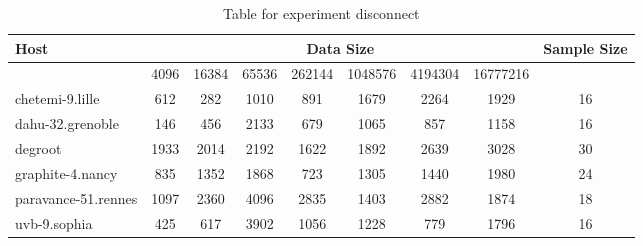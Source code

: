 \begin{table}
\caption{Table for experiment disconnect}
\begin{tabular}{@{}lcccccccc@{}}
\toprule
Host    & \multicolumn{7}{c}{Data Size}          & Sample Size \\ \midrule
& 4096  & 16384  & 65536  & 262144  & 1048576  & 4194304  & 16777216              \\ \midrule
chetemi-9.lille  & 612  & 282  & 1010  & 891  & 1679  & 2264  & 1929  & 16 \\
dahu-32.grenoble  & 146  & 456  & 2133  & 679  & 1065  & 857  & 1158  & 16 \\
degroot  & 1933  & 2014  & 2192  & 1622  & 1892  & 2639  & 3028  & 30 \\
graphite-4.nancy  & 835  & 1352  & 1868  & 723  & 1305  & 1440  & 1980  & 24 \\
paravance-51.rennes  & 1097  & 2360  & 4096  & 2835  & 1403  & 2882  & 1874  & 18 \\
uvb-9.sophia  & 425  & 617  & 3902  & 1056  & 1228  & 779  & 1796  & 16 \\
\bottomrule
\end{tabular}
\end{table}